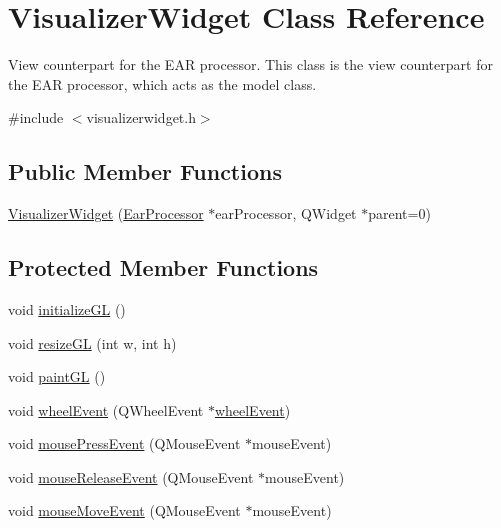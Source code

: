 \hypertarget{classVisualizerWidget}{\section{\-Visualizer\-Widget \-Class \-Reference}
\label{d0/d59/classVisualizerWidget}
}


\-View counterpart for the \-E\-A\-R processor. \-This class is the view counterpart for the \-E\-A\-R processor, which acts as the model class.  




{\ttfamily \#include $<$visualizerwidget.\-h$>$}

\subsection*{\-Public \-Member \-Functions}
\begin{DoxyCompactItemize}
\item 
\hyperlink{classVisualizerWidget_a2a1c3e13268f5ad39a0b572f1a83ecd8}{\-Visualizer\-Widget} (\hyperlink{classEarProcessor}{\-Ear\-Processor} $\ast$ear\-Processor, \-Q\-Widget $\ast$parent=0)
\end{DoxyCompactItemize}
\subsection*{\-Protected \-Member \-Functions}
\begin{DoxyCompactItemize}
\item 
void \hyperlink{classVisualizerWidget_a552249fa383f2b2b176a2c2515118ad5}{initialize\-G\-L} ()
\item 
void \hyperlink{classVisualizerWidget_ad8177d473032aaf76443c1d0cdaba121}{resize\-G\-L} (int w, int h)
\item 
void \hyperlink{classVisualizerWidget_a6be9ffb9f7ec557d2ffbd5f04a62ea79}{paint\-G\-L} ()
\item 
void \hyperlink{classVisualizerWidget_a2f876ba7d56e5ded0baa31c0b84f4fdf}{wheel\-Event} (\-Q\-Wheel\-Event $\ast$\hyperlink{classVisualizerWidget_a2f876ba7d56e5ded0baa31c0b84f4fdf}{wheel\-Event})
\item 
void \hyperlink{classVisualizerWidget_a788ef7f0f7e79792fb9cf9dfee46a68c}{mouse\-Press\-Event} (\-Q\-Mouse\-Event $\ast$mouse\-Event)
\item 
void \hyperlink{classVisualizerWidget_a7aeb0ab48e51df90923d78783fcd9a73}{mouse\-Release\-Event} (\-Q\-Mouse\-Event $\ast$mouse\-Event)
\item 
void \hyperlink{classVisualizerWidget_a2624dee9deddb05703cb67442d35bcc0}{mouse\-Move\-Event} (\-Q\-Mouse\-Event $\ast$mouse\-Event)
\end{DoxyCompactItemize}


